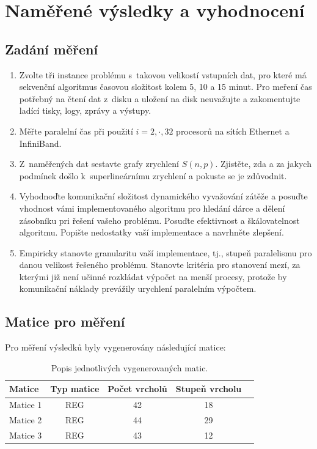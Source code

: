 \documentclass[12pt]{article}
\begin{document}
\section{Naměřené výsledky a vyhodnocení}

\subsection{Zadání měření}
\begin{enumerate}
\item Zvolte tři instance problému s~takovou velikostí vstupních dat, pro které má
sekvenční algoritmus časovou složitost kolem 5, 10 a 15 minut. Pro
meření čas potřebný na čtení dat z~disku a uložení na disk
neuvažujte a zakomentujte ladící tisky, logy, zprávy a výstupy.
\item Měřte paralelní čas při použití $i=2,\cdot,32$ procesorů na sítích Ethernet a InfiniBand.
\item Z~naměřených dat sestavte grafy zrychlení $S(n,p)$. Zjistěte, zda a za jakych podmínek
došlo k~superlineárnímu zrychlení a pokuste se je zdůvodnit.
\item Vyhodnoďte komunikační složitost dynamického vyvažování zátěže a posuďte
vhodnost vámi implementovaného algoritmu pro hledání dárce a dělení
zásobníku pri řešení vašeho problému. Posuďte efektivnost a
škálovatelnost algoritmu. Popište nedostatky vaší implementace a
navrhněte zlepšení.
\item Empiricky stanovte
granularitu vaší implementace, tj., stupeň paralelismu pro danou
velikost řešeného problému. Stanovte kritéria pro stanovení mezí, za
kterými již není učinné rozkládat výpočet na menší procesy, protože
by komunikační náklady prevážily urychlení paralelním výpočtem.
\end{enumerate}

\subsection{Matice pro měření}
Pro měření výsledků byly vygenerovány následující matice:
\begin{table}[ht]
\centering
\begin{tabular}{|l|c|c|c|c|}
\hline \textbf{Matice} & \textbf{Typ matice} & \textbf{Počet vrcholů} & \textbf{Stupeň vrcholu} \\
\hline 
\hline Matice 1 & REG & 42 & 18 \\ 
\hline Matice 2 & REG & 44 & 29 \\ 
\hline Matice 3 & REG & 43 & 12 \\ 
\hline 
\end{tabular}
\caption{Popis jednotlivých vygenerovaných matic.}
\label{matice_popis}	
\end{table}
\end{document}
